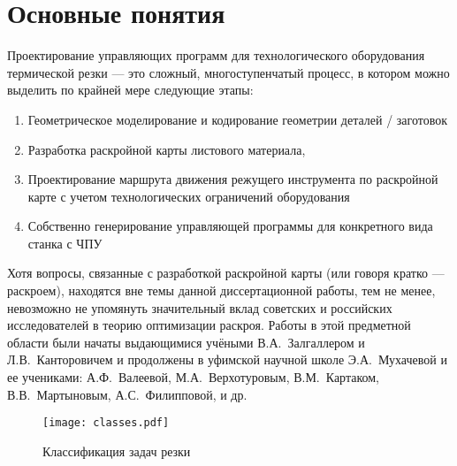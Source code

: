 
\section{Основные понятия}

Проектирование управляющих программ
для технологического оборудования термической резки ---
это сложный, многоступенчатый процесс,
в котором можно выделить по крайней мере следующие этапы:
\begin{enumerate}
  \item
  Геометрическое моделирование и кодирование
  геометрии деталей / заготовок
  \item
  Разработка раскройной карты листового материала,
  \item
  Проектирование маршрута движения режущего инструмента
  по раскройной карте
  с учетом технологических ограничений оборудования
  \item
  Собственно генерирование управляющей программы
  для конкретного вида станка с ЧПУ
\end{enumerate}

Хотя вопросы, связанные с разработкой раскройной карты
\cite{bi:Nesting}
(или говоря кратко --- раскроем),
находятся вне темы данной диссертационной работы,
тем не менее,
невозможно не упомянуть
значительный вклад советских и российских исследователей
в теорию оптимизации раскроя.
Работы в этой предметной области
были начаты выдающимися учёными В.А.~Залгаллером
и Л.В.~Канторовичем
\cite{bi:Nesting0}
и продолжены в уфимской научной школе
Э.А.~Мухачевой и ее учениками:
А.Ф.~Валеевой,
М.А.~Верхотуровым,
В.М.~Картаком,
В.В.~Мартыновым,
А.С.~Филипповой, и др.
\cite{bi:мухачева1984,bi:мухачева1998}

\begin{figure}
  \centering
  \texttt{[image: classes.pdf]}
  \caption{Классификация задач резки}
  \label{fig:cut-classes}
\end{figure}
